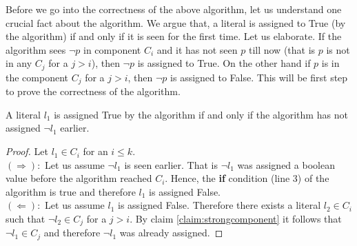 Before we go into the correctness of the above algorithm, let us understand one crucial fact about the algorithm. We argue that, a literal is assigned to True (by the algorithm) if and only if it is seen for the first time. Let us elaborate. If the algorithm sees $\neg p$ in component $C_i$ and it has not seen $p$ till now (that is $p$ is not in any $C_j$ for a $j>i$), then $\neg p$ is assigned to True. On the other hand if $p$ is in the component $C_j$ for a $j>i$, then $\neg p$ is assigned to False. This will be first step to prove the correctness of the algorithm.
\begin{claim}
A literal $l_1$ is assigned True by the algorithm if and only if the algorithm has not assigned $\neg l_1$ earlier.
\end{claim}
\begin{proof}
Let $l_1 \in C_i$ for an $i \leq k$.  \\
$(\Rightarrow):$ Let us assume $\neg l_1$ is seen earlier. That is $\neg l_1$ was assigned a boolean value before the algorithm reached $C_i$. Hence, the {\bf if} condition (line 3) of the algorithm is true and therefore $l_1$ is assigned False. \\
$(\Leftarrow):$ Let us assume $l_1$ is assigned False. Therefore there exists a literal $l_2 \in C_i$ such that $\neg l_2 \in C_j$ for a $j > i$. By claim \ref{claim:strongcomponent} it follows that $\neg l_1 \in C_j$ and therefore $\neg l_1$ was already assigned.
\end{proof}


